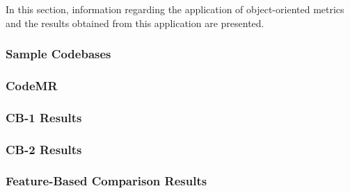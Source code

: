 In this section, information regarding the application of object-oriented metrics and the results obtained from this application are presented.

\subsubsection{Sample Codebases}
\label{section:4.3.1}


\subsubsection{CodeMR}


\subsubsection{CB-1 Results}


\subsubsection{CB-2 Results}


\subsubsection{Feature-Based Comparison Results}

